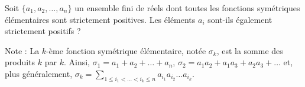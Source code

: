 Soit $\{a_1, a_2, \dots, a_n\}$ un ensemble fini de réels dont toutes les fonctions symétriques élémentaires sont strictement positives. Les éléments $a_i$ sont-ils également strictement positifs ?

Note : La $k$-ème fonction symétrique élémentaire, notée $\sigma_k$, est la somme des produits $k$ par $k$. Ainsi, $\sigma_1 = a_1 + a_2 + \dots + a_n$, $ \sigma_2 = a_1a_2 + a_1a_3 + a_2a_3 + \dots$ et, plus généralement, $\sigma_k = \sum_{1\le i_1 < \dots < i_k \le n} a_{i_1}a_{i_2}\dots a_{i_k}$.